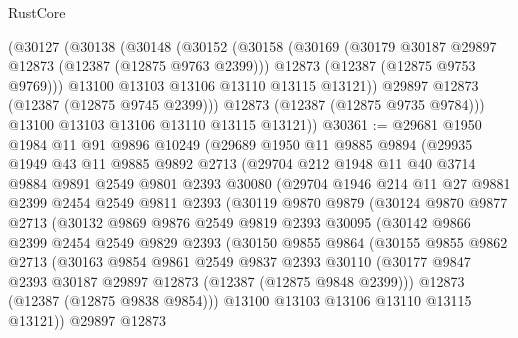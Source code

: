 \begin{lexlean}{RustCore}
\begin{coremodule}
      (@30127
        (@30138
          (@30148
            (@30152
              (@30158
                (@30169
                  (@30179 @30187 @29897 @12873 (@12387 (@12875 @9763 @2399)))
                  @12873
                  (@12387 (@12875 @9753 @9769)))
                @13100
                @13103
                @13106
                @13110
                @13115
                @13121))
            @29897
            @12873
            (@12387 (@12875 @9745 @2399)))
          @12873
          (@12387 (@12875 @9735 @9784)))
        @13100
        @13103
        @13106
        @13110
        @13115
        @13121))
@30361 := @29681
    @1950
    @1984
    @11
    @91
    @9896
    @10249
    (@29689
      @1950
      @11
      @9885
      @9894
      (@29935
        @1949
        @43
        @11
        @9885
        @9892
        @2713
        (@29704
          @212
          @1948
          @11
          @40
          @3714
          @9884
          @9891
          @2549
          @9801
          @2393
          @30080
          (@29704
            @1946
            @214
            @11
            @27
            @9881
            @2399
            @2454
            @2549
            @9811
            @2393
            (@30119
              @9870
              @9879
              (@30124
                @9870
                @9877
                @2713
                (@30132
                  @9869
                  @9876
                  @2549
                  @9819
                  @2393
                  @30095
                  (@30142
                    @9866
                    @2399
                    @2454
                    @2549
                    @9829
                    @2393
                    (@30150
                      @9855
                      @9864
                      (@30155
                        @9855
                        @9862
                        @2713
                        (@30163
                          @9854
                          @9861
                          @2549
                          @9837
                          @2393
                          @30110
                          (@30177 @9847 @2393 @30187 @29897 @12873 (@12387 (@12875 @9848 @2399)))
                          @12873
                          (@12387 (@12875 @9838 @9854)))
                        @13100
                        @13103
                        @13106
                        @13110
                        @13115
                        @13121))
                    @29897
                    @12873

\end{coremodule}
\end{lexlean}
